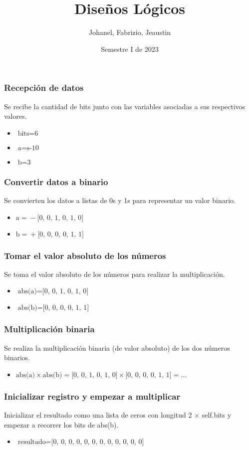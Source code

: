 \documentclass{beamer}
\title{Diseños Lógicos}
\author{Johanel, Fabrizio, Jeaustin}
\institute{Tecnológico de Costa Rica}
\date{Semestre I de 2023}
\begin{document}
\begin{frame}
\frametitle{Recepción de datos}
Se recibe la cantidad de bits junto con las variables asociadas a sus respectivos valores.
\begin{itemize}
\item $\text{bits} = \text{6}$
\item $\text{a} = \text{s-10}$
\item $\text{b} = \text{3}$
\end{itemize}
\end{frame}
\begin{frame}
\frametitle{Convertir datos a binario}
Se convierten los datos a listas de 0s y 1s para representar un valor binario.
\begin{itemize}
\item $\text{a} = \text{} - \text{[0, 0, 1, 0, 1, 0]}$
\item $\text{b} = \text{} + \text{[0, 0, 0, 0, 1, 1]}$
\end{itemize}
\end{frame}
\begin{frame}
\frametitle{Tomar el valor absoluto de los números}
Se toma el valor absoluto de los números para realizar la multiplicación.
\begin{itemize}
\item $\text{abs(a)} = \text{[0, 0, 1, 0, 1, 0]}$
\item $\text{abs(b)} = \text{[0, 0, 0, 0, 1, 1]}$
\end{itemize}
\end{frame}
\begin{frame}
\frametitle{Multiplicación binaria}
Se realiza la multiplicación binaria (de valor absoluto) de los dos números binarios.
\begin{itemize}
\item $\text{abs(a)} \times \text{abs(b)} = \text{[0, 0, 1, 0, 1, 0]} \times \text{[0, 0, 0, 0, 1, 1]} = \text{...}$
\end{itemize}
\end{frame}
\begin{frame}
\frametitle{Inicializar registro y empezar a multiplicar}
Inicializar el resultado como una lista de ceros con longitud 2 $\times$ self.bits y empezar a recorrer los bits de abs(b).
\begin{itemize}
\item $\text{resultado} = \text{[0, 0, 0, 0, 0, 0, 0, 0, 0, 0, 0, 0]}$
\end{itemize}
\end{frame}
\end{document}

